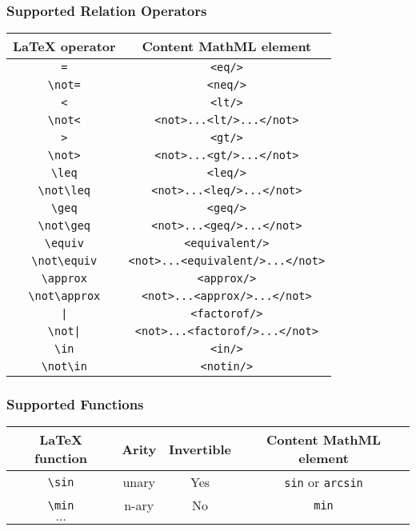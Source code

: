 \subsubsection*{Supported Relation Operators}

\begin{tabular}{|c|c|}
\hline
LaTeX operator & Content MathML element \\
\hline
\verb|=| & \verb|<eq/>| \\
\verb|\not=| & \verb|<neq/>| \\
\verb|<| & \verb|<lt/>| \\
\verb|\not<| & \verb|<not>...<lt/>...</not>| \\
\verb|>| & \verb|<gt/>| \\
\verb|\not>| & \verb|<not>...<gt/>...</not>| \\
\verb|\leq| & \verb|<leq/>| \\
\verb|\not\leq| & \verb|<not>...<leq/>...</not>| \\
\verb|\geq| & \verb|<geq/>| \\
\verb|\not\geq| & \verb|<not>...<geq/>...</not>| \\
\verb|\equiv| & \verb|<equivalent/>| \\
\verb|\not\equiv| & \verb|<not>...<equivalent/>...</not>| \\
\verb|\approx| & \verb|<approx/>| \\
\verb|\not\approx| & \verb|<not>...<approx/>...</not>| \\
\verb.|. & \verb|<factorof/>| \\
\verb.\not|. & \verb|<not>...<factorof/>...</not>| \\
\verb|\in| & \verb|<in/>| \\
\verb|\not\in| & \verb|<notin/>| \\
\hline
\end{tabular}

\subsubsection*{Supported Functions}

\begin{tabular}{|c|c|c|c|}
\hline
LaTeX function & Arity & Invertible & Content MathML element \\
\hline
\verb|\sin| & unary & Yes & \verb|sin| or \verb|arcsin| \\
\verb|\min| & n-ary & No & \verb|min| \\
$\ldots$ & & & \\
\hline
\end{tabular}

